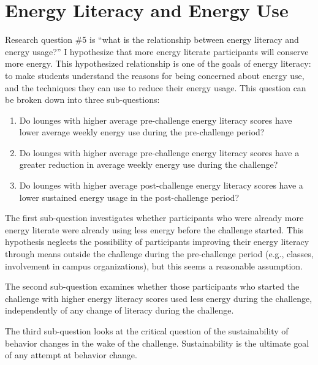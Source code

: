 

\section{Energy Literacy and Energy Use}

Research question \#5 is ``what is the relationship between energy literacy and energy usage?'' I hypothesize that more energy literate participants will conserve more energy. This hypothesized relationship is one of the goals of energy literacy: to make students understand the reasons for being concerned about energy use, and the techniques they can use to reduce their energy usage. This question can be broken down into three sub-questions:

\begin{enumerate}
	\item Do lounges with higher average pre-challenge energy literacy scores have lower average weekly energy use during the pre-challenge period?
	\item Do lounges with higher average pre-challenge energy literacy scores have a greater reduction in average weekly energy use during the challenge?
	\item Do lounges with higher average post-challenge energy literacy scores have a lower sustained energy usage in the post-challenge period?
\end{enumerate}

The first sub-question investigates whether participants who were already more energy literate were already using less energy before the challenge started. This hypothesis neglects the possibility of participants improving their energy literacy through means outside the challenge during the pre-challenge period (e.g., classes, involvement in campus organizations), but this seems a reasonable assumption.

The second sub-question examines whether those participants who started the challenge with higher energy literacy scores used less energy during the challenge, independently of any change of literacy during the challenge.

The third sub-question looks at the critical question of the sustainability of behavior changes in the wake of the challenge. Sustainability is the ultimate goal of any attempt at behavior change.

